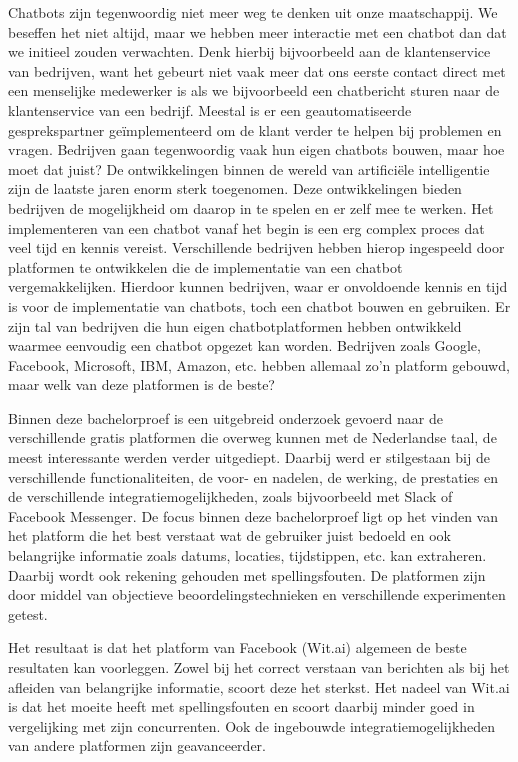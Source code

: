 Chatbots zijn tegenwoordig niet meer weg te denken uit onze maatschappij. We beseffen het niet altijd, maar we hebben meer interactie met een chatbot dan dat we initieel zouden verwachten. Denk hierbij bijvoorbeeld aan de klantenservice van bedrijven, want het gebeurt niet vaak meer dat ons eerste contact direct met een menselijke medewerker is als we bijvoorbeeld een chatbericht sturen naar de klantenservice van een bedrijf. Meestal is er een geautomatiseerde gesprekspartner geïmplementeerd om de klant verder te helpen bij problemen en vragen. Bedrijven gaan tegenwoordig vaak hun eigen chatbots bouwen, maar hoe moet dat juist? De ontwikkelingen binnen de wereld van artificiële intelligentie zijn de laatste jaren enorm sterk toegenomen. Deze ontwikkelingen bieden bedrijven de mogelijkheid om daarop in te spelen en er zelf mee te werken. Het implementeren van een chatbot vanaf het begin is een erg complex proces dat veel tijd en kennis vereist. Verschillende bedrijven hebben hierop ingespeeld door platformen te ontwikkelen die de implementatie van een chatbot vergemakkelijken. Hierdoor kunnen bedrijven, waar er onvoldoende kennis en tijd is voor de implementatie van chatbots, toch een chatbot bouwen en gebruiken. Er zijn tal van bedrijven die hun eigen chatbotplatformen hebben ontwikkeld waarmee eenvoudig een chatbot opgezet kan worden. Bedrijven zoals Google, Facebook, Microsoft, IBM, Amazon, etc. hebben allemaal zo’n platform gebouwd, maar welk van deze platformen is de beste?

Binnen deze bachelorproef is een uitgebreid onderzoek gevoerd naar de verschillende gratis platformen die overweg kunnen met de Nederlandse taal, de meest interessante werden verder uitgediept. Daarbij werd er stilgestaan bij de verschillende functionaliteiten, de voor- en nadelen, de werking, de prestaties en de verschillende integratiemogelijkheden, zoals bijvoorbeeld met Slack of Facebook Messenger. De focus binnen deze bachelorproef ligt op het vinden van het platform die het best verstaat wat de gebruiker juist bedoeld en ook belangrijke informatie zoals datums, locaties, tijdstippen, etc. kan extraheren. Daarbij wordt ook rekening gehouden met spellingsfouten. De platformen zijn door middel van objectieve beoordelingstechnieken en verschillende experimenten getest. 

Het resultaat is dat het platform van Facebook (Wit.ai) algemeen de beste resultaten kan voorleggen. Zowel bij het correct verstaan van berichten als bij het afleiden van belangrijke informatie, scoort deze het sterkst. Het nadeel van Wit.ai is dat het moeite heeft met spellingsfouten en scoort daarbij minder goed in vergelijking met zijn concurrenten. Ook de ingebouwde integratiemogelijkheden van andere platformen zijn geavanceerder.

